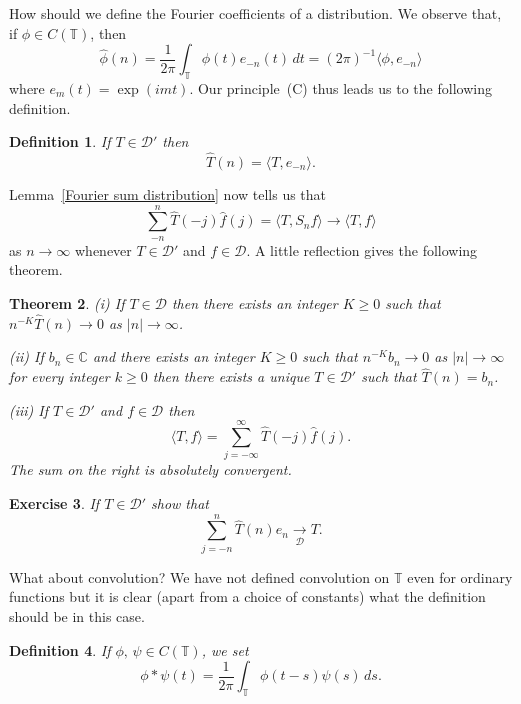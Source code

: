 \documentclass[12pt]{article}
\newtheorem{theorem}{Theorem}[section]
\newtheorem{definition}[theorem]{Definition}
\newtheorem{exercise}[theorem]{Exercise}
\theoremstyle{definition}
\newcommand{\arrowD}{\underset{\mathcal D}{\rightarrow}}
\begin{document}
How should we define the Fourier coefficients of a distribution.
We observe that, if $\phi\in C({\mathbb T})$, then
\[\hat{\phi}(n)=\frac{1}{2\pi}\int_{\mathbb T}\phi(t)e_{-n}(t)\,dt
=(2\pi)^{-1}\langle \phi,e_{-n}\rangle\]
where $e_{m}(t)=\exp(imt)$. Our principle~(C)
thus leads us to the following definition.
\begin{definition} If $T\in{\mathcal D}'$ then
\[\hat{T}(n)=\langle T,e_{-n}\rangle.\]
\end{definition}
Lemma~\ref{Fourier sum distribution} now tells us that
\[\sum_{-n}^{n}\hat{T}(-j)\hat{f}(j)
=\langle T,S_{n}f\rangle\rightarrow \langle T,f\rangle\]
as $n\rightarrow\infty$ whenever $T\in{\mathcal D}'$
and $f\in{\mathcal D}$. A little reflection gives
the following theorem.
\begin{theorem}\label{Distribution is series}
(i) If $T\in{\mathcal D}$ then there exists an integer $K\geq 0$
such that
$n^{-K}\hat{T}(n)\rightarrow 0$
as $|n|\rightarrow\infty$.

(ii) If $b_{n}\in{\mathbb C}$ and there exists an integer $K\geq 0$
such that $n^{-K}b_{n}\rightarrow 0$
as $|n|\rightarrow\infty$ for every integer $k\geq 0$
then there exists a unique $T\in{\mathcal D}'$ such that
$\hat{T}(n)=b_{n}$.

(iii) If $T\in{\mathcal D}'$
and $f\in{\mathcal D}$ then
\[\langle T,f\rangle=\sum_{j=-\infty}^{\infty}\hat{T}(-j)\hat{f}(j).\]
The sum on the right is absolutely convergent.
\end{theorem}
\begin{exercise} If $T\in{\mathcal D}'$ show that
\[\sum_{j=-n}^{n}\hat{T}(n)e_{n}\arrowD T.\]
\end{exercise}

What about convolution? We have not defined convolution
on ${\mathbb T}$ even for ordinary functions but it
is clear (apart from a choice of constants) what the
definition should be in this case. 
\begin{definition} If $\phi,\,\psi\in C({\mathbb T})$,
we set
\[\phi*\psi(t)=\frac{1}{2\pi}\int_{\mathbb T}\phi(t-s)\psi(s)\,ds.\]
\end{definition}
\end{document}
